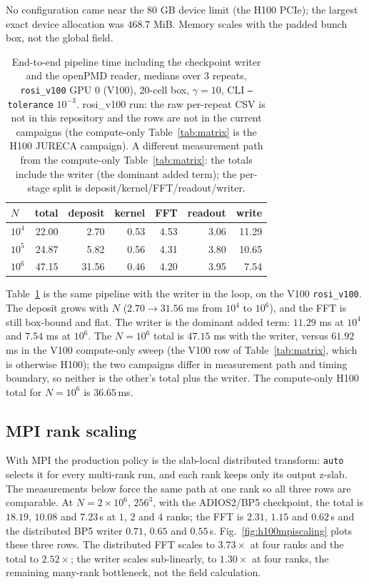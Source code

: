 No configuration came near the $80$ GB device limit (the H100 PCIe); the
largest exact device allocation was $468.7$ MiB. Memory scales with the
padded bunch box, not the global field.

\begin{table}[t]
\centering
\small
\caption{End-to-end pipeline time including the checkpoint writer and the
openPMD reader, medians over 3 repeats, \texttt{rosi\_v100} GPU 0 (V100),
20-cell box, $\gamma=10$, CLI \texttt{--tolerance} $10^{-3}$.
rosi\_v100 run: the raw per-repeat CSV is not in this repository and the
rows are not in the current campaigns (the compute-only
Table~\ref{tab:matrix} is the H100 JURECA campaign). A
different measurement path from the compute-only
Table~\ref{tab:matrix}: the totals include the writer (the dominant added
term); the per-stage split is deposit/kernel/FFT/readout/writer.}
\label{tab:e2e}
\begin{tabular}{lrrrrrr}
\toprule
$N$ & total & deposit & kernel & FFT & readout & write \\
\midrule
$10^{4}$  & 22.00 & 2.70  & 0.53 & 4.53 & 3.06 & 11.29 \\
$10^{5}$  & 24.87 & 5.82  & 0.56 & 4.31 & 3.80 & 10.65 \\
$10^{6}$  & 47.15 & 31.56 & 0.46 & 4.20 & 3.95 & 7.54  \\
\bottomrule
\end{tabular}
\end{table}

Table~\ref{tab:e2e} is the same pipeline with the writer in the loop, on
the V100 \texttt{rosi\_v100}. The deposit grows with $N$
($2.70\to31.56$ ms from $10^4$ to $10^6$), and the FFT is still box-bound
and flat. The writer is the dominant added term: $11.29$ ms at $10^4$ and
$7.54$ ms at $10^6$. The $N=10^6$ total is $47.15$ ms with the writer,
versus $61.92$ ms in the V100 compute-only sweep (the V100 row of
Table~\ref{tab:matrix}, which is otherwise H100); the two campaigns differ in
measurement path and timing boundary, so neither is the other's total plus
the writer. The compute-only H100 total for $N=10^6$ is $36.65$\,ms.

\subsection{MPI rank scaling}
\label{sec:mpi-scale}

With MPI the production policy is the slab-local distributed transform:
\texttt{auto} selects it for every multi-rank run, and each rank keeps only
its output z-slab.  The measurements below force the same path at one rank so
all three rows are comparable.  At $N=2\times10^{6}$, $256^3$, with the
ADIOS2/BP5 checkpoint, the total is $18.19$, $10.08$ and $7.23$\,s at $1$,
$2$ and $4$ ranks; the FFT is $2.31$, $1.15$ and $0.62$\,s and the
distributed BP5 writer $0.71$, $0.65$ and $0.55$\,s.  Fig.~\ref{fig:h100mpiscaling}
plots these three rows.  The distributed FFT
scales to $3.73\times$ at four ranks and the total to $2.52\times$; the
writer scales sub-linearly, to $1.30\times$ at four ranks, the remaining
many-rank bottleneck, not the field calculation.

